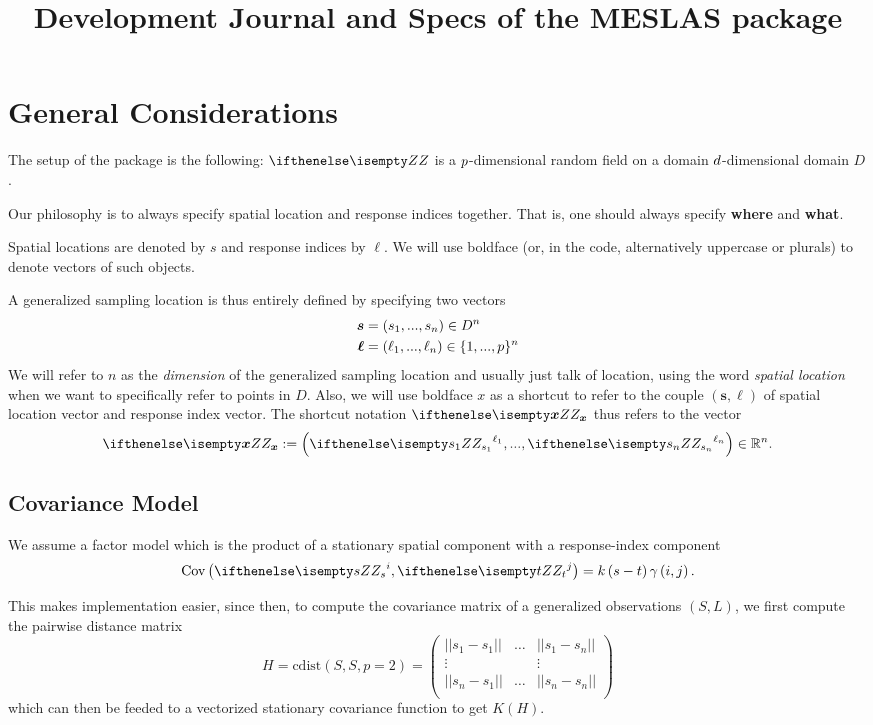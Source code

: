 \documentclass[a4paper,10pt]{article}
\title{Development Journal and Specs of the MESLAS package
}
\begin{document}
\maketitle

\section{General Considerations}
The setup of the package is the following: $\gp$ is a $p$-dimensional random
field on a domain $d$-dimensional
domain $D$.

Our philosophy is to always specify spatial location and response indices
together. That is, one should always specify \textbf{where} and \textbf{what}.

Spatial locations are denoted by $s$ and response indices by $\ell$. We will
use boldface (or, in the code, alternatively uppercase or plurals) to denote
vectors of such objects.

\medskip
A generalized sampling location is thus entirely defined by specifying two vectors
\begin{align*}
    \bm{s} &= \left(s_1, ..., s_n\right)\in D^n\\
    \bm{\ell} &= \left(\ell_1, ..., \ell_n\right) \in \lbrace 1, ..., p
    \rbrace^n
\end{align*}
We will refer to $n$ as the \textit{dimension} of the generalized sampling
location and usually just talk of location, using the word \textit{spatial
location} when we want to specifically refer to points in $D$. Also, we will
use boldface $x$ as a shortcut to refer to the couple $\left(\bm{s},
\bm{\ell}\right)$ of spatial location vector and response index vector.
The shortcut notation $\gp[\bm{x}]$ thus refers to the
vector
\[
    \gp[\bm{x}]:=\left(\gp[s_1]^{\ell_1}, ..., \gp[s_n]^{\ell_n}\right) \in
    \mathbb{R}^n.
\]

\subsection{Covariance Model}
We assume a factor model which is the product of a stationary spatial component
with a response-index component
\begin{equation}
    \textrm{Cov}\left(\gp[s]^i, \gp[t]^j\right) = k\left(s - t\right)
    \gamma\left(i, j\right).
\end{equation}

This makes implementation easier, since then, to compute the covariance matrix
of a generalized observations $\left(S, L\right)$, we first compute the
pairwise distance matrix
\[
    H = \textrm{cdist}\left(S,S, p=2\right) = \begin{pmatrix}
        ||s_1 - s_1|| & \dots & ||s_1 - s_n||\\
        \vdots &  & \vdots \\
        ||s_n - s_1|| & \dots & ||s_n - s_n||\\
    \end{pmatrix}
\]
which can then be feeded to a vectorized stationary covariance function to get
$K(H)$.
\end{document}
